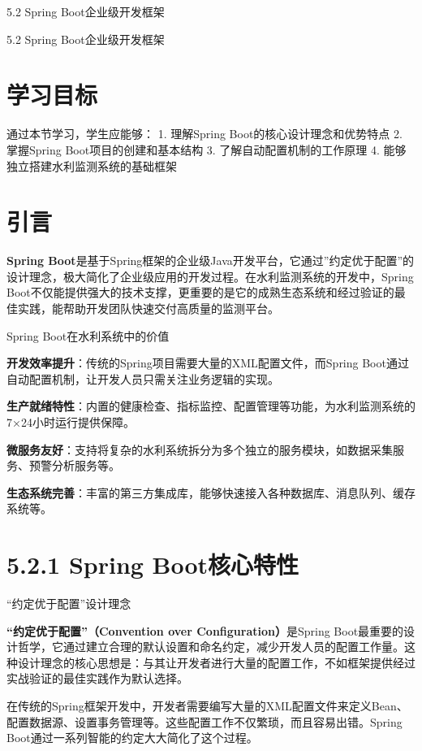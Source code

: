  5.2 Spring Boot企业级开发框架

 5.2 Spring Boot企业级开发框架

\section{学习目标}

通过本节学习，学生应能够： 1. 理解Spring Boot的核心设计理念和优势特点 2. 掌握Spring Boot项目的创建和基本结构 3. 了解自动配置机制的工作原理 4. 能够独立搭建水利监测系统的基础框架

\section{引言}

\textbf{Spring Boot}是基于Spring框架的企业级Java开发平台，它通过''约定优于配置''的设计理念，极大简化了企业级应用的开发过程。在水利监测系统的开发中，Spring Boot不仅能提供强大的技术支撑，更重要的是它的成熟生态系统和经过验证的最佳实践，能帮助开发团队快速交付高质量的监测平台。

 Spring Boot在水利系统中的价值

\textbf{开发效率提升}：传统的Spring项目需要大量的XML配置文件，而Spring Boot通过自动配置机制，让开发人员只需关注业务逻辑的实现。

\textbf{生产就绪特性}：内置的健康检查、指标监控、配置管理等功能，为水利监测系统的7×24小时运行提供保障。

\textbf{微服务友好}：支持将复杂的水利系统拆分为多个独立的服务模块，如数据采集服务、预警分析服务等。

\textbf{生态系统完善}：丰富的第三方集成库，能够快速接入各种数据库、消息队列、缓存系统等。

\section{5.2.1 Spring Boot核心特性}

 ``约定优于配置''设计理念

\textbf{``约定优于配置''（Convention over Configuration）}是Spring Boot最重要的设计哲学，它通过建立合理的默认设置和命名约定，减少开发人员的配置工作量。这种设计理念的核心思想是：与其让开发者进行大量的配置工作，不如框架提供经过实战验证的最佳实践作为默认选择。

在传统的Spring框架开发中，开发者需要编写大量的XML配置文件来定义Bean、配置数据源、设置事务管理等。这些配置工作不仅繁琐，而且容易出错。Spring Boot通过一系列智能的约定大大简化了这个过程。

